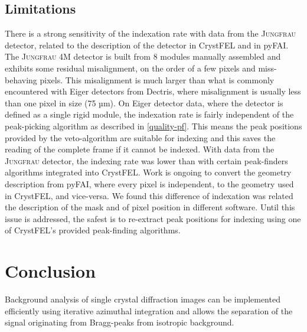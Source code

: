 \documentclass[preprint]{iucr}              %
\begin{document}
\subsection{Limitations}
There is a strong sensitivity of the indexation rate with data from the \textsc{Jungfrau} detector, related to the description of the detector in CrystFEL and in pyFAI.
The \textsc{Jungfrau} 4M detector is built from 8 modules manually assembled and exhibits some residual misalignment, on the order of a few pixels and miss-behaving pixels.
This misalignment is much larger than what is commonly encountered with Eiger detectors from Dectris, where misalignment is usually less than one pixel in size (75 µm).
On Eiger detector data, where the detector is defined as a single rigid module, the indexation rate is fairly independent of the peak-picking algorithm as described in \ref{quality-pf}.
This means the peak positions provided by the veto-algorithm are suitable for indexing and this saves the reading of the complete frame if it cannot be indexed.
With data from the \textsc{Jungfrau} detector, the indexing rate was lower than with certain peak-finders algorithms integrated into CrystFEL. 
Work is ongoing to convert the geometry description from pyFAI, where every pixel is independent, to the geometry used in CrystFEL, and vice-versa. 
We found this difference of indexation was related the description of the mask and of pixel position in different software.
Until this issue is addressed, the safest is to re-extract peak positions for indexing using one of CrystFEL's provided peak-finding algorithms. 

\section{Conclusion}

Background analysis of single crystal diffraction images can be implemented efficiently using iterative azimuthal integration and allows the separation of the signal originating from Bragg-peaks from isotropic background.
\end{document}
